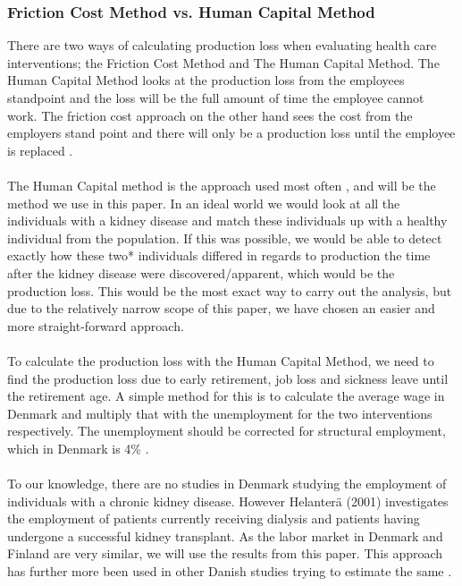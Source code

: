 \documentclass[a4paper,12pt]{article}
\begin{document}
\subsubsection*{Friction Cost Method  vs.  Human Capital Method }
There are two ways of calculating production loss when evaluating health care interventions; the Friction Cost Method and The Human Capital Method. The Human Capital Method looks at the production loss from the employees standpoint and the loss will be the full amount of time the employee cannot work. The friction cost approach on the other hand sees the cost from the employers stand point and there will only be a production loss until the employee is replaced \cite{friktion}. 
\\\\
The Human Capital method is the approach used most often \cite{friktion}, and will be the method we use in this paper. In an ideal world we would look at all the individuals with a kidney disease and match these individuals up with a healthy individual from the population. If this was possible, we would be able to detect exactly how these two* individuals differed in regards to production the time after the kidney disease were discovered/apparent, which would be the production loss. This would be the most exact way to carry out the analysis, but due to the relatively narrow scope of this paper, we have chosen an easier and more straight-forward approach. 
\\\\
To calculate the production loss with the Human Capital Method, we need to find the production loss due to early retirement, job loss and sickness leave until the retirement age. A simple method for this is to calculate the average wage in Denmark and multiply that with the unemployment for the two interventions respectively. The unemployment should be corrected for structural employment, which in Denmark is 4\% \cite{ledighed}. 
\\\\
To our knowledge, there are no studies in Denmark studying the employment of individuals with a chronic kidney disease. However Helanterä (2001) investigates the employment of patients currently receiving dialysis and patients having undergone a successful kidney transplant. As the labor market in Denmark and Finland are very similar, we will use the results from this paper. This approach has further more been used in other Danish studies trying to estimate the same \cite{Erika}. 
\\\\
\end{document}

